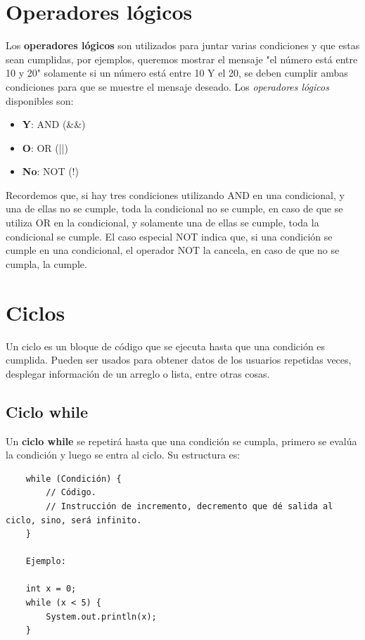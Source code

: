 \section{Operadores lógicos}
\hspace{0.55cm}Los \textbf{operadores lógicos} son utilizados para juntar varias condiciones y que estas sean cumplidas, por ejemplos, queremos mostrar el mensaje "el número está entre 10 y 20" solamente si un número está entre 10 Y el 20, se deben cumplir ambas condiciones para que se muestre el mensaje deseado. Los \textit{operadores lógicos} disponibles son:
\begin{itemize}
    \item \textbf{Y}: AND (\&\&)
    \item \textbf{O}: OR (||)
    \item \textbf{No}: NOT (!)
\end{itemize}

Recordemos que, si hay tres condiciones utilizando AND en una condicional, y una de ellas no se cumple, toda la condicional no se cumple, en caso de que se utiliza OR en la condicional, y solamente una de ellas se cumple, toda la condicional se cumple. El caso especial NOT indica que, si una condición se cumple en una condicional, el operador NOT la cancela, en caso de que no se cumpla, la cumple.



\section{Ciclos}
\hspace{0.55cm}Un ciclo es un bloque de código que se ejecuta hasta que una condición es cumplida. Pueden ser usados para obtener datos de los usuarios repetidas veces, desplegar información de un arreglo o lista, entre otras cosas.


\subsection{Ciclo while}
\hspace{0.55cm}Un \textbf{ciclo while} se repetirá hasta que una condición se cumpla, primero se evalúa la condición y luego se entra al ciclo. Su estructura es:
\begin{lstlisting}
    while (Condición) {
        // Código.
        // Instrucción de incremento, decremento que dé salida al ciclo, sino, será infinito.
    }
    
    Ejemplo:
    
    int x = 0;
    while (x < 5) {
        System.out.println(x);
    }
\end{lstlisting}


